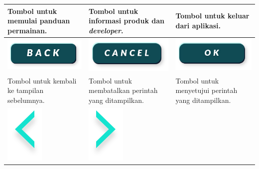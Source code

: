 \begin{table}[h]
\begin{tabular}{|C{3 cm}|C{3 cm}|C{3 cm}|}
				Tombol untuk memulai panduan permainan.&
				Tombol untuk  informasi produk dan \textit{developer}.& 
				Tombol untuk keluar dari aplikasi.\\ \hline
				\includegraphics[width=0.7\linewidth]{img/bab3/button/back_sblm.png}&
				\includegraphics[width=0.7\linewidth]{img/bab3/button/cancel_sblm.png}&
				\includegraphics[width=0.7\linewidth]{img/bab3/button/ok_sblm.png} \\ 
				Tombol untuk kembali ke tampilan sebelumnya.\label{fig:tb_back}&
				Tombol untuk membatalkan perintah yang ditampilkan.\label{fig:tb_cancel}& 
				Tombol untuk menyetujui perintah yang ditampilkan.\label{fig:tb_ok}\\ \hline
				\includegraphics[width=0.2\linewidth]{img/bab3/button/kiri_sblm.png}&
				\includegraphics[width=0.2\linewidth]{img/bab3/button/kanan_sblm.png}&

\end{tabular}
\end{table}

